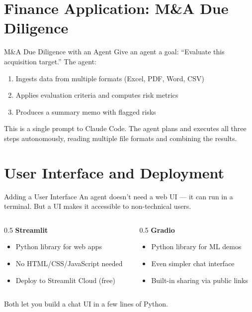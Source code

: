 \documentclass[aspectratio=169]{beamer}
\begin{document}
\section{Finance Application: M\&A Due Diligence}

\begin{frame}{M\&A Due Diligence with an Agent}
Give an agent a goal: ``Evaluate this acquisition target.'' The agent:
\vspace{0.3cm}
\begin{enumerate}
  \item Ingests data from multiple formats (Excel, PDF, Word, CSV)
  \item Applies evaluation criteria and computes risk metrics
  \item Produces a summary memo with flagged risks
\end{enumerate}
\vspace{0.3cm}
\alert{This is a single prompt to Claude Code.} The agent plans and executes all three steps autonomously, reading multiple file formats and combining the results.
\end{frame}

\section{User Interface and Deployment}

\begin{frame}{Adding a User Interface}
An agent doesn't need a web UI --- it can run in a terminal. But a UI makes it accessible to non-technical users.
\vspace{0.3cm}
\begin{columns}[T]
\begin{column}{0.5\textwidth}
\textbf{Streamlit}
\begin{itemize}\small
  \item Python library for web apps
  \item No HTML/CSS/JavaScript needed
  \item Deploy to Streamlit Cloud (free)
\end{itemize}
\end{column}
\begin{column}{0.5\textwidth}
\textbf{Gradio}
\begin{itemize}\small
  \item Python library for ML demos
  \item Even simpler chat interface
  \item Built-in sharing via public links
\end{itemize}
\end{column}
\end{columns}
\vspace{0.3cm}
\begin{center}
\alert{Both let you build a chat UI in a few lines of Python.}
\end{center}
\end{frame}
\end{document}
